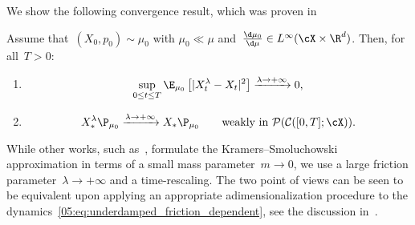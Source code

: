 We show the following convergence result, which was proven in~
\begin{proposition}
\label{05:prop:overdamped_limit}
Assume that~$(X_0,p_0)\sim \mu_0$ with $\mu_0\ll\mu$ and~$\frac{\d\mu_0}{\d\mu}\in L^\infty(\cX\times \R^d)$. Then, for all~$T>0$:
\begin{enumerate}
    \item{\begin{equation}
    \label{05:eq:convergence_in_l2}
    \underset{0\leq t\leq T}{\sup}\,\E_{\mu_0}\left[|X_t^\lambda-X_t|^2\right]\xrightarrow{\lambda\to+\infty}0,
    \end{equation}}
    \item{\begin{equation}
    \label{05:eq:convergence_in_law}
    X^\lambda_* \P_{\mu_0}\xrightarrow{\lambda\to +\infty}X_*\P_{\mu_0}\qquad\text{weakly in }\mathcal P(\mathcal C([0,T];\cX)).
\end{equation}}
\end{enumerate}
\end{proposition}

\begin{remark}
    While other works, such as~\cite{HMVW15}, formulate the Kramers--Smoluchowski approximation in terms of a small mass parameter~$m\to 0$, we use a large friction parameter~$\lambda\to+\infty$ and a time-rescaling. The two point of views can be seen to be equivalent upon applying an appropriate adimensionalization procedure to the dynamics~\eqref{05:eq:underdamped_friction_dependent}, see the discussion in~\cite[Section 2.2.4]{LRS10}.
\end{remark}

